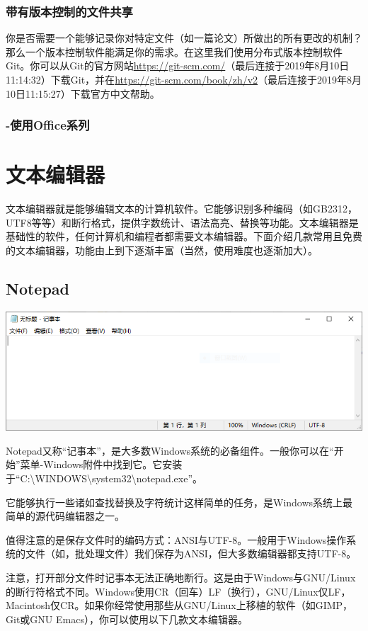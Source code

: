 \subsubsection{带有版本控制的文件共享}
你是否需要一个能够记录你对特定文件（如一篇论文）所做出的所有更改的机制？那么一个版本控制软件能满足你的需求。在这里我们使用分布式版本控制软件Git。你可以从Git的官方网站\url{https://git-scm.com/}（最后连接于2019年8月10日11:14:32）下载Git，并在\url{https://git-scm.com/book/zh/v2}（最后连接于2019年8月10日11:15:27）下载官方中文帮助。
\subsubsection{-使用Office系列}
\section{文本编辑器}
文本编辑器就是能够编辑文本的计算机软件。它能够识别多种编码（如GB2312，UTF8等等）和断行格式，提供字数统计、语法高亮、替换等功能。文本编辑器是基础性的软件，任何计算机和编程者都需要文本编辑器。下面介绍几款常用且免费的文本编辑器，功能由上到下逐渐丰富（当然，使用难度也逐渐加大）。
\subsection{Notepad}
\begin{center}
\includegraphics[scale=0.8]{pic/winnotepad.PNG}	
\end{center} \par
Notepad又称“记事本”，是大多数Windows系统的必备组件。一般你可以在“开始”菜单-Windows附件中找到它。它安装于“C:\textbackslash WINDOWS\textbackslash system32\textbackslash notepad.exe”。\par
它能够执行一些诸如查找替换及字符统计这样简单的任务，是Windows系统上最简单的源代码编辑器之一。\par
值得注意的是保存文件时的编码方式：ANSI与UTF-8。一般用于Windows操作系统的文件（如，批处理文件）我们保存为ANSI，但大多数编辑器都支持UTF-8。\par
注意，打开部分文件时记事本无法正确地断行。这是由于Windows与GNU/Linux的断行符格式不同。Windows使用CR（回车）LF（换行），GNU/Linux仅LF，Macintosh仅CR。如果你经常使用那些从GNU/Linux上移植的软件（如GIMP，Git或GNU Emacs），你可以使用以下几款文本编辑器。
